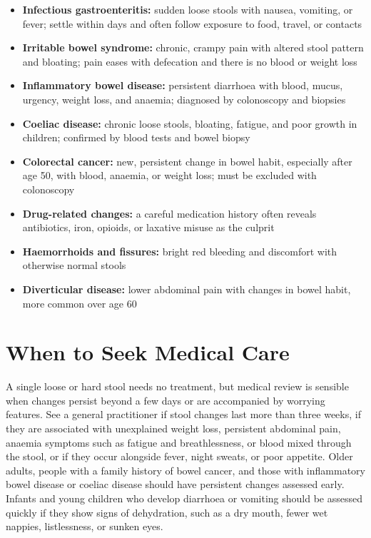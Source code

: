 \begin{itemize}
    \item \textbf{Infectious gastroenteritis:} sudden loose stools with nausea, vomiting, or fever; settle within days and often follow exposure to food, travel, or contacts
    \item \textbf{Irritable bowel syndrome:} chronic, crampy pain with altered stool pattern and bloating; pain eases with defecation and there is no blood or weight loss
    \item \textbf{Inflammatory bowel disease:} persistent diarrhoea with blood, mucus, urgency, weight loss, and anaemia; diagnosed by colonoscopy and biopsies
    \item \textbf{Coeliac disease:} chronic loose stools, bloating, fatigue, and poor growth in children; confirmed by blood tests and bowel biopsy
    \item \textbf{Colorectal cancer:} new, persistent change in bowel habit, especially after age 50, with blood, anaemia, or weight loss; must be excluded with colonoscopy
    \item \textbf{Drug-related changes:} a careful medication history often reveals antibiotics, iron, opioids, or laxative misuse as the culprit
    \item \textbf{Haemorrhoids and fissures:} bright red bleeding and discomfort with otherwise normal stools
    \item \textbf{Diverticular disease:} lower abdominal pain with changes in bowel habit, more common over age 60
\end{itemize}

\section*{When to Seek Medical Care}
A single loose or hard stool needs no treatment, but medical review is sensible when changes persist beyond a few days or are accompanied by worrying features. See a general practitioner if stool changes last more than three weeks, if they are associated with unexplained weight loss, persistent abdominal pain, anaemia symptoms such as fatigue and breathlessness, or blood mixed through the stool, or if they occur alongside fever, night sweats, or poor appetite. Older adults, people with a family history of bowel cancer, and those with inflammatory bowel disease or coeliac disease should have persistent changes assessed early. Infants and young children who develop diarrhoea or vomiting should be assessed quickly if they show signs of dehydration, such as a dry mouth, fewer wet nappies, listlessness, or sunken eyes.


